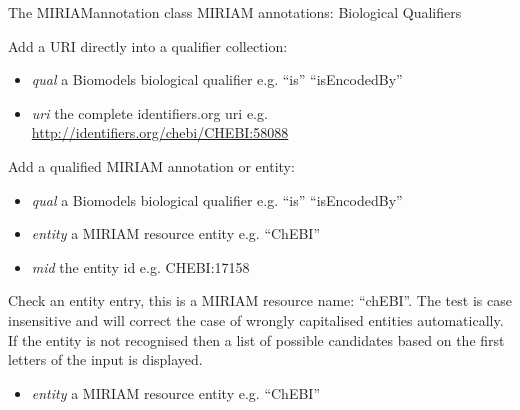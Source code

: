\documentclass[a4paper,11pt,english]{sphinxmanual}
\begin{document}
\begin{fulllineitems}
\label{modules_doc:cbmpy.CBDataStruct.MIRIAMannotation}
The MIRIAMannotation class MIRIAM annotations: Biological Qualifiers

\begin{fulllineitems}
\label{modules_doc:cbmpy.CBDataStruct.MIRIAMannotation.addIDorgURI}
Add a URI directly into a qualifier collection:
\begin{itemize}
\item {} 
\emph{qual} a Biomodels biological qualifier e.g. ``is'' ``isEncodedBy''

\item {} 
\emph{uri} the complete identifiers.org uri e.g. \href{http://identifiers.org/chebi/CHEBI:58088}{http://identifiers.org/chebi/CHEBI:58088}

\end{itemize}

\end{fulllineitems}


\begin{fulllineitems}
\label{modules_doc:cbmpy.CBDataStruct.MIRIAMannotation.addMIRIAMannotation}
Add a qualified MIRIAM annotation or entity:
\begin{itemize}
\item {} 
\emph{qual} a Biomodels biological qualifier e.g. ``is'' ``isEncodedBy''

\item {} 
\emph{entity} a MIRIAM resource entity e.g. ``ChEBI''

\item {} 
\emph{mid} the entity id e.g. CHEBI:17158

\end{itemize}

\end{fulllineitems}


\begin{fulllineitems}
\label{modules_doc:cbmpy.CBDataStruct.MIRIAMannotation.checkEntity}
Check an entity entry, this is a MIRIAM resource name: ``chEBI''. The test is case insensitive and will correct the case
of wrongly capitalised entities automatically. If the entity is not recognised then a list of possible candidates
based on the first letters of the input is displayed.
\begin{itemize}
\item {} 
\emph{entity} a MIRIAM resource entity e.g. ``ChEBI''


\end{itemize}
\end{fulllineitems}
\end{fulllineitems}
\end{document}
